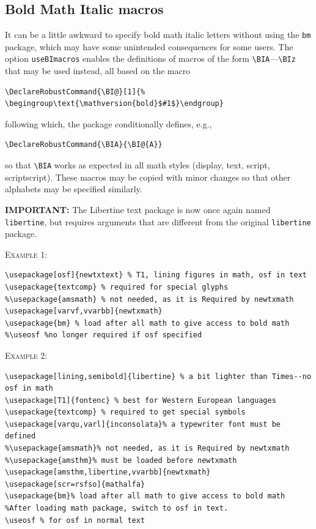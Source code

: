 \documentclass[\fsc]{article}
\theoremstyle{oldplain}
\theoremstyle{plain}
\begin{document}
\subsection{Bold Math Italic macros}
It can be a little awkward to specify bold math italic letters without using the \texttt{bm} package, which may have some unintended consequences for some users. The option \texttt{useBImacros} enables the definitions of macros of the form \verb|\BIA|---\verb|\BIz| that may be used instead, all based on the macro 
\begin{verbatim}
\DeclareRobustCommand{\BI@}[1]{%
\begingroup\text{\mathversion{bold}$#1$}\endgroup}
\end{verbatim}
following which, the package conditionally defines, e.g.,
\begin{verbatim}
\DeclareRobustCommand{\BIA}{\BI@{A}}
\end{verbatim}
so that \verb|\BIA| works as expected in all math styles (display, text, script, scriptscript). These macros may be copied with minor changes so that other alphabets may be specified similarly.

\textbf{IMPORTANT:} The Libertine text package is now once again named {\tt libertine}, but requires arguments that are different from the original {\tt libertine} package.

\textsc{Example 1:}
\begin{verbatim}
\usepackage[osf]{newtxtext} % T1, lining figures in math, osf in text
\usepackage{textcomp} % required for special glyphs
%\usepackage{amsmath} % not needed, as it is Required by newtxmath
\usepackage[varvf,vvarbb]{newtxmath}
\usepackage{bm} % load after all math to give access to bold math
%\useosf %no longer required if osf specified
\end{verbatim}
\textsc{Example 2:}
\begin{verbatim}
\usepackage[lining,semibold]{libertine} % a bit lighter than Times--no osf in math
\usepackage[T1]{fontenc} % best for Western European languages
\usepackage{textcomp} % required to get special symbols
\usepackage[varqu,varl]{inconsolata}% a typewriter font must be defined
%\usepackage{amsmath}% not needed, as it is Required by newtxmath
%\usepackage{amsthm}% must be loaded before newtxmath
\usepackage[amsthm,libertine,vvarbb]{newtxmath}
\usepackage[scr=rsfso]{mathalfa}
\usepackage{bm}% load after all math to give access to bold math
%After loading math package, switch to osf in text.
\useosf % for osf in normal text
\end{verbatim}
\end{document}
